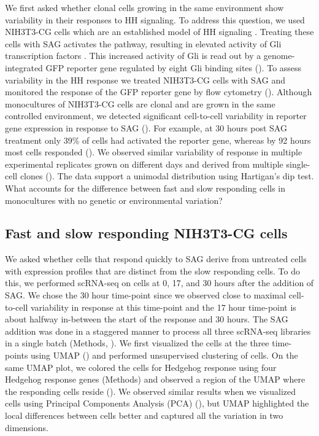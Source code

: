 We first asked whether clonal cells growing in the same environment show variability in their responses to HH signaling. To address this question, we used NIH3T3-CG cells which are an established model of HH signaling \cite{Pusapati2018-gs,Kinnebrew2019-gt}. Treating these cells with SAG activates the pathway, resulting in elevated activity of Gli transcription factors \cite{Briscoe2013-ze,Lee2016-bf,Kong2019-wo}. This increased activity of Gli is read out by a genome-integrated GFP reporter gene regulated by eight Gli binding sites (). To assess variability in the HH response we treated NIH3T3-CG cells with SAG and monitored the response of the GFP reporter gene by flow cytometry (). Although monocultures of NIH3T3-CG cells are clonal and are grown in the same controlled environment, we detected significant cell-to-cell variability in reporter gene expression in response to SAG (). For example, at 30 hours post SAG treatment only 39\% of cells had activated the reporter gene, whereas by 92 hours most cells responded (). We observed similar variability of response in multiple experimental replicates grown on different days and derived from multiple single-cell clones ().  The data support a unimodal distribution using Hartigan’s dip test\cite{Hartigan1985-zq}. What accounts for the difference between fast and slow responding cells in monocultures with no genetic or environmental variation?

\subsection{Fast and slow responding NIH3T3-CG cells}


We asked whether cells that respond quickly to SAG derive from untreated cells with expression profiles that are distinct from the slow responding cells. To do this, we performed scRNA-seq on cells at 0, 17, and 30 hours after the addition of SAG. We chose the 30 hour time-point since we observed close to maximal cell-to-cell variability in response at this time-point and the 17 hour time-point is about halfway in-between the start of the response and 30 hours. The SAG addition was done in a staggered manner to process all three scRNA-seq libraries in a single batch (Methods, ). We first visualized the cells at the three time-points using UMAP () and performed unsupervised clustering of cells. On the same UMAP plot, we colored the cells for Hedgehog response using four Hedgehog response genes (Methods) and observed a region of the UMAP where the responding cells reside (). We observed similar results when we visualized cells using Principal Components Analysis (PCA) (), but UMAP highlighted the local differences between cells better and captured all the variation in two dimensions.

